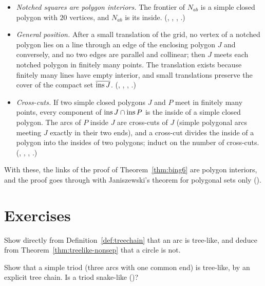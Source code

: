 \begin{itemize}
\item \emph{Notched squares are polygon interiors.} The frontier of $N_{ab}$ is a simple closed
polygon with $20$ vertices, and $N_{ab}$ is its inside.
(, ,
, .)
\item \emph{General position.} After a small translation of the grid, no vertex of a notched polygon
lies on a line through an edge of the enclosing polygon $J$ and conversely, and no two edges are
parallel and collinear; then $J$ meets each notched polygon in finitely many points. The translation
exists because finitely many lines have empty interior, and small translations preserve the cover of
the compact set $\overline{\operatorname{ins} J}$.
(, ,
, .)
\item \emph{Cross-cuts.} If two simple closed polygons $J$ and $P$ meet in finitely many points, every
component of $\operatorname{ins} J\cap\operatorname{ins} P$ is the inside of a simple closed polygon. The arcs of $P$ inside $J$
are cross-cuts of $J$ (simple polygonal arcs meeting $J$ exactly in their two ends), and a cross-cut
divides the inside of a polygon into the insides of two polygons; induct on the number of cross-cuts.
(, ,
,
.)
\end{itemize}

With these, the links of the proof of Theorem~\ref{thm:bing6} are polygon interiors, and the proof
goes through with Janiszewski's theorem for polygonal sets only
().

\section*{Exercises}

\begin{exercise}
Show directly from Definition~\ref{def:treechain} that an arc is tree-like, and deduce from
Theorem~\ref{thm:treelike-nonsep} that a circle is not.
\end{exercise}

\begin{exercise}
Show that a simple triod (three arcs with one common end) is tree-like, by an explicit tree chain.
Is a triod snake-like ()?
\end{exercise}

